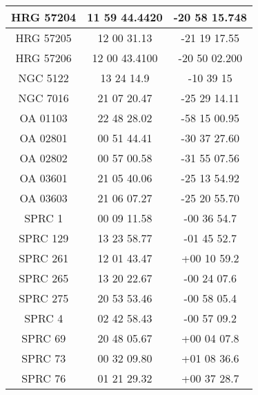 \begin{apendicesenv}
\begin{longtable}{|c|c|c|}
            HRG 57204 & 11 59 44.4420 & -20 58 15.748 \\ \hline
            HRG 57205 & 12 00 31.13 & -21 19 17.55 \\ \hline
            HRG 57206 & 12 00 43.4100 & -20 50 02.200 \\ \hline
            NGC 5122 & 13 24 14.9 & -10 39 15 \\ \hline
            NGC 7016 & 21 07 20.47 & -25 29 14.11 \\ \hline
            OA 01103 & 22 48 28.02 & -58 15 00.95 \\ \hline
            OA 02801 & 00 51 44.41 & -30 37 27.60 \\ \hline
            OA 02802 & 00 57 00.58 & -31 55 07.56 \\ \hline
            OA 03601 & 21 05 40.06 & -25 13 54.92 \\ \hline
            OA 03603 & 21 06 07.27 & -25 20 55.70 \\ \hline
            SPRC 1 & 00 09 11.58 & -00 36 54.7 \\ \hline
            SPRC 129 & 13 23 58.77 & -01 45 52.7 \\ \hline
            SPRC 261 & 12 01 43.47 & +00 10 59.2 \\ \hline
            SPRC 265 & 13 20 22.67 & -00 24 07.6 \\ \hline
            SPRC 275 & 20 53 53.46 & -00 58 05.4 \\ \hline
            SPRC 4 & 02 42 58.43 & -00 57 09.2 \\ \hline
            SPRC 69 & 20 48 05.67 & +00 04 07.8 \\ \hline
            SPRC 73 & 00 32 09.80 & +01 08 36.6 \\ \hline
            SPRC 76 & 01 21 29.32 & +00 37 28.7 \\ \hline
        \end{longtable}

\end{apendicesenv}